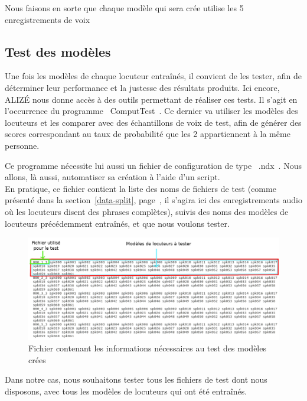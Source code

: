 \documentclass[a4paper, 12pt]{book}
\newcounter{program}[subsection]
\begin{document}
Nous faisons en sorte que chaque modèle qui sera crée utilise les 5 enregistrements de voix 

\subsection{Test des modèles}

Une fois les modèles de chaque locuteur entraînés, il convient de les tester, afin de déterminer leur performance et la justesse des résultats produits. Ici encore, ALIZÉ nous donne accès à des outils permettant de réaliser ces tests. Il s'agit en l'occurrence du programme \guillemotleft{}~ComputTest~\guillemotright{}. Ce dernier va utiliser les modèles des locuteurs et les comparer avec des échantillons de voix de test, afin de générer des scores correspondant au taux de probabilité que les 2 appartiennent à la même personne.

Ce programme nécessite lui aussi un fichier de configuration de type \guillemotleft{}~.ndx~\guillemotright{}. Nous allons, là aussi, automatiser sa création à l'aide d'un script.\\

En pratique, ce fichier contient la liste des noms de fichiers de test (comme présenté dans la section~\ref{data-split}, page~\pageref{data-split}, il s'agira ici des enregistrements audio où les locuteurs disent des phrases complètes), suivis des noms des modèles de locuteurs précédemment entraînés, et que nous voulons tester.

\begin{figure}[htbp]
  \centering
  \includegraphics[width=1\linewidth]{images/testFile.png}
  \caption{Fichier contenant les informations nécessaires au test des modèles crées}
\end{figure}

Dans notre cas, nous souhaitons tester tous les fichiers de test dont nous disposons, avec tous les modèles de locuteurs qui ont été entraînés.
\end{document}
